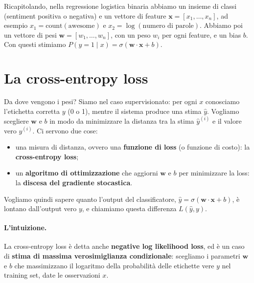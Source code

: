 Ricapitolando, nella regressione logistica binaria abbiamo un insieme di classi (sentiment positiva o negativa) e un vettore di feature $\mathbf{x} = [x_1, \dots, x_n]$, ad esempio $x_1 = \text{count}(\text{awesome})$ e $x_2 = \log(\text{numero di parole})$. Abbiamo poi un vettore di pesi $\mathbf{w} = [w_1, \dots, w_n]$, con un peso $w_i$ per ogni feature, e un bias $b$. Con questi stimiamo $P(y = 1 \mid x) = \sigma(\mathbf{w} \cdot \mathbf{x} + b)$.

\section{La cross-entropy loss}
Da dove vengono i pesi? Siamo nel caso supervisionato: per ogni $x$ conosciamo l'etichetta corretta $y$ (0 o 1), mentre il sistema produce una stima $\hat{y}$. Vogliamo scegliere $\mathbf{w}$ e $b$ in modo da minimizzare la distanza tra la stima $\hat{y}^{(i)}$ e il valore vero $y^{(i)}$. Ci servono due cose:
\begin{itemize}
    \item una misura di distanza, ovvero una \textbf{funzione di loss} (o funzione di costo): la \textbf{cross-entropy loss};
    \item un \textbf{algoritmo di ottimizzazione} che aggiorni $\mathbf{w}$ e $b$ per minimizzare la loss: la \textbf{discesa del gradiente stocastica}.
\end{itemize}
Vogliamo quindi sapere quanto l'output del classificatore, $\hat{y} = \sigma(\mathbf{w} \cdot \mathbf{x} + b)$, è lontano dall'output vero $y$, e chiamiamo questa differenza $L(\hat{y}, y)$.

\paragraph{L'intuizione.} La cross-entropy loss è detta anche \textbf{negative log likelihood loss}, ed è un caso di \textbf{stima di massima verosimiglianza condizionale}: scegliamo i parametri $\mathbf{w}$ e $b$ che massimizzano il logaritmo della probabilità delle etichette vere $y$ nel training set, date le osservazioni $x$.

